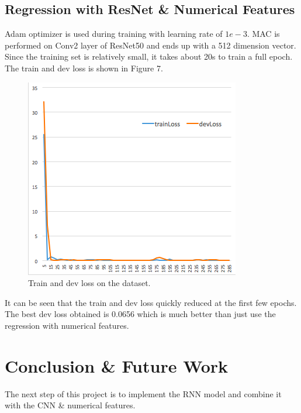 \documentclass{article} %
\begin{document}
\subsection{Regression with ResNet \& Numerical Features}

Adam optimizer is used during training with learning rate of $1e-3$.
MAC is performed on Conv2 layer of ResNet50 and ends up with a 512 dimension vector.
Since the training set is relatively small,
it takes about 20s to train a full epoch.
The train and dev loss is shown in Figure 7.

\begin{figure}[h]
	\begin{center}
		\includegraphics[width=0.45\linewidth]{fig/loss.png}
	\end{center}
	\caption{Train and dev loss on the dataset.}
	\label{fig:long}
	\label{fig:onecol}
\end{figure}

It can be seen that the train and dev loss quickly reduced at the first few epochs.
The best dev loss obtained is 0.0656 which is much better than just use the regression
with numerical features.



\section{Conclusion \& Future Work}

The next step of this project is to implement the RNN model and combine it with the CNN \& numerical features.

{\small
	
	
}
\end{document}
